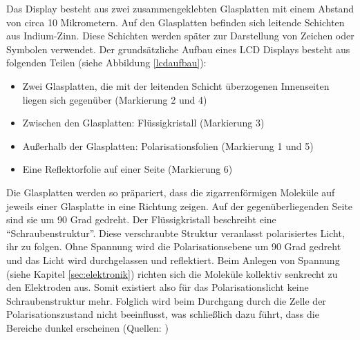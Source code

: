 Das Display besteht aus zwei zusammengeklebten Glasplatten mit einem Abstand von circa 10 Mikrometern. Auf den Glasplatten befinden sich leitende Schichten aus Indium-Zinn. Diese Schichten werden später zur Darstellung von Zeichen oder Symbolen verwendet. Der grundsätzliche Aufbau eines LCD Displays besteht aus folgenden Teilen (siehe Abbildung \ref{lcdaufbau}):
\begin{itemize}
\item Zwei Glasplatten, die mit der leitenden Schicht überzogenen Innenseiten liegen sich gegenüber (Markierung 2 und 4)
\item Zwischen den Glasplatten: Flüssigkristall (Markierung 3)
\item Außerhalb der Glasplatten: Polarisationsfolien (Markierung 1 und 5)
\item Eine Reflektorfolie auf einer Seite (Markierung 6)
\end{itemize}
Die Glasplatten werden so präpariert, dass die zigarrenförmigen Moleküle auf jeweils einer Glasplatte in eine Richtung zeigen. Auf der gegenüberliegenden Seite sind sie um 90 Grad gedreht. Der Flüssigkristall beschreibt eine “Schraubenstruktur”.
Diese verschraubte Struktur veranlasst polarisiertes Licht, ihr zu folgen. Ohne Spannung wird die Polarisationsebene um 90 Grad gedreht und das Licht wird durchgelassen und reflektiert. Beim Anlegen von Spannung (siehe Kapitel \ref{sec:elektronik}) richten sich die Moleküle kollektiv senkrecht zu den Elektroden aus.
Somit existiert also für das Polarisationslicht keine Schraubenstruktur mehr.
Folglich wird beim Durchgang durch die Zelle der Polarisationszustand nicht beeinflusst, was schließlich dazu führt, dass die Bereiche dunkel erscheinen (Quellen: \cite{Bauanleitung} \cite{aufbau_und_funktion})


